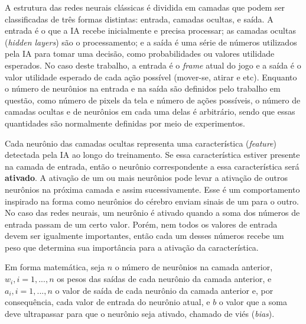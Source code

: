 A estrutura das redes neurais clássicas é dividida em camadas que podem ser classificadas de três formas distintas: entrada, camadas ocultas, e saída.
A entrada é o que a IA recebe inicialmente e precisa processar; as camadas ocultas (\textit{hidden layers}) são o processamento; e a saída é uma série de números utilizados pela IA para tomar uma decisão, como probabilidades ou valores utilidade esperados. No caso deste trabalho, a entrada é o \textit{frame} atual do jogo e a saída é o valor utilidade esperado de cada ação possível (mover-se, atirar e etc).
Enquanto o número de neurônios na entrada e na saída são definidos pelo trabalho em questão, como número de pixels da tela e número de ações possíveis, o número de camadas ocultas e de neurônios em cada uma delas é arbitrário, sendo que essas quantidades são normalmente definidas por meio de experimentos.

Cada neurônio das camadas ocultas representa uma característica (\textit{feature}) detectada pela IA ao longo do treinamento. Se essa característica estiver presente na camada de entrada, então o neurônio correspondente a essa característica será \textbf{ativado}. A ativação de um ou mais neurônios pode levar a ativação de outros neurônios na próxima camada e assim sucessivamente. Esse é um comportamento inspirado na forma como neurônios do cérebro enviam sinais de um para o outro. No caso das redes neurais, um neurônio é ativado quando a soma dos números de entrada passam de um certo valor. Porém, nem todos os valores de entrada devem ser igualmente importantes, então cada um desses números recebe um peso que determina sua importância para a ativação da característica.

Em forma matemática, seja $n$ o número de neurônios na camada anterior, $w_{i}, i = 1, ..., n$ os pesos das saídas de cada neurônio da camada anterior, e $a_{i}, i = 1, ..., n$ o valor de saída de cada neurônio da camada anterior e, por consequência, cada valor de entrada do neurônio atual, e $b$ o valor que a soma deve ultrapassar para que o neurônio seja ativado, chamado de viés (\textit{bias}).

